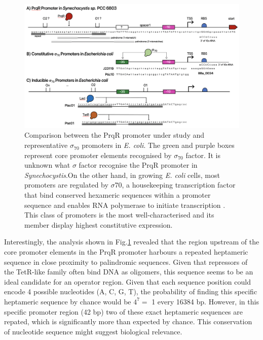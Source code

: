 \begin{figure}[H]
    \centering
    \includegraphics[width=\textwidth]{images/f1reporters.png}
    \caption{Comparison between the PrqR promoter under study and representative $\sigma_{70}$ promoters in \textit{E. coli}. The green and purple boxes represent core promoter elements recognised by $\sigma_{70}$ factor. It is unknown what $\sigma$ factor recognise the PrqR promoter in \textit{Synechocystis}.On the other hand, in growing \textit{E. coli} cells, most promoters are regulated by $\sigma$70, a housekeeping transcription factor that bind conserved hexameric sequences within a promoter sequence and enables RNA polymerase to initiate transcription \citep{Chen2018}. This class of promoters is the most well-characterised and its member display highest constitutive expression.}
    \label{fig:f1}
\end{figure}

Interestingly, the analysis shown in Fig.\ref{fig:f1} revealed that the region upstream of the core promoter elements in the PrqR promoter harbours a repeated heptameric sequence in close proximity to palindromic sequences. Given that repressors of the TetR-like family often bind DNA as oligomers, this sequence seems to be an ideal candidate for an operator region. 
Given that each sequence position could encode 4 possible nucleotides (A, C, G, T), the probability of finding this specific heptameric sequence by chance would be $4^{7} =$ 1 every 16384 bp. However, in this specific promoter region (42 bp) two of these exact heptameric sequences are repated, which is significantly more than expected by chance. This conservation of nucleotide sequence might suggest biological relevance.

